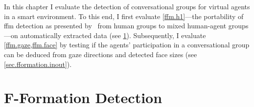 In this chapter I evaluate the detection of \glspl{conversational group} for \glspl{virtual agent} in a \gls{smart environment}.
To this end, I first evaluate \cref{ffm.h1}---the portability of \gls{ffm} detection as presented by~ from human groups to mixed human-agent groups---on automatically extracted data (see \cref{sec.fformation.fformation}).
Subsequently, I evaluate \cref{ffm.gaze,ffm.face} by testing if the agents' participation in a \gls{conversational group} can be deduced from gaze directions and detected face sizes (see \cref{sec.fformation.inout}).

\section{F-Formation Detection}\label{sec.fformation.fformation}

